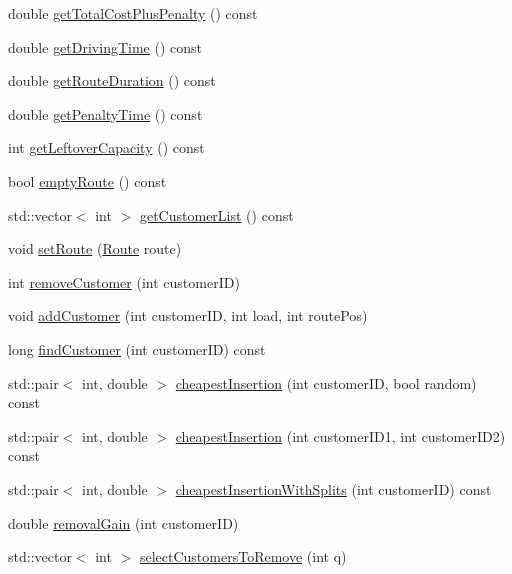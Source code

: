 \begin{DoxyCompactItemize}
\item 
double \hyperlink{class_vehicle_a57dd3fc27076f460d4cac3b750aeb011}{get\+Total\+Cost\+Plus\+Penalty} () const
\item 
double \hyperlink{class_vehicle_a6bda1a96e5899e343ca77250bd981ce2}{get\+Driving\+Time} () const
\item 
double \hyperlink{class_vehicle_a5b63ad191aa37fb3e66cec0c9b0b3b0f}{get\+Route\+Duration} () const
\item 
double \hyperlink{class_vehicle_aa0406e5066d59ee8921e6f8871cbecd7}{get\+Penalty\+Time} () const
\item 
int \hyperlink{class_vehicle_afd53834ae8fc6fea1a972a864b939a36}{get\+Leftover\+Capacity} () const
\item 
bool \hyperlink{class_vehicle_ac6bd9e1d4e12dae417a39f2b2f0095cc}{empty\+Route} () const
\item 
std\+::vector$<$ int $>$ \hyperlink{class_vehicle_a57563afe2a3e1c6da5823a0a9a9f45dd}{get\+Customer\+List} () const
\item 
void \hyperlink{class_vehicle_adc355690a822465f0ef1f715a2e4d7f4}{set\+Route} (\hyperlink{class_route}{Route} route)
\item 
int \hyperlink{class_vehicle_a6e9fa8957af9cec9ce1c43d6876aef1f}{remove\+Customer} (int customer\+ID)
\item 
void \hyperlink{class_vehicle_a0bf2a5756305d6a25ec42859ebd0446e}{add\+Customer} (int customer\+ID, int load, int route\+Pos)
\item 
long \hyperlink{class_vehicle_a6e8bb4ad5126e5b7ed6894a11400449e}{find\+Customer} (int customer\+ID) const
\item 
std\+::pair$<$ int, double $>$ \hyperlink{class_vehicle_adb33f8fb253b1a07bc95222bbbe6c043}{cheapest\+Insertion} (int customer\+ID, bool random) const
\item 
std\+::pair$<$ int, double $>$ \hyperlink{class_vehicle_abf82bff362dc1de38abed9ea458a273d}{cheapest\+Insertion} (int customer\+I\+D1, int customer\+I\+D2) const
\item 
std\+::pair$<$ int, double $>$ \hyperlink{class_vehicle_aac0bd58150982e96f5ef36638a4c6ec4}{cheapest\+Insertion\+With\+Splits} (int customer\+ID) const
\item 
double \hyperlink{class_vehicle_a87f565121f05f568af1b59b3506cb59a}{removal\+Gain} (int customer\+ID)
\item 
std\+::vector$<$ int $>$ \hyperlink{class_vehicle_aed568174291108fd205254033927bbfd}{select\+Customers\+To\+Remove} (int q)
\item 

\end{DoxyCompactItemize}
